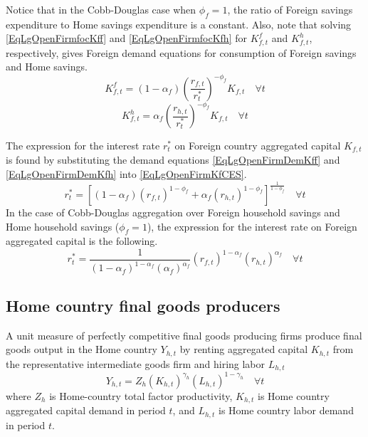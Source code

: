 \documentclass[letterpaper,12pt]{article}
\theoremstyle{definition}
\begin{document}
    Notice that in the Cobb-Douglas case when $\phi_f=1$, the ratio of Foreign savings expenditure to Home savings expenditure is a constant. Also, note that solving \eqref{EqLgOpenFirmfocKff} and \eqref{EqLgOpenFirmfocKfh} for $K^f_{f,t}$ and $K^h_{f,t}$, respectively, gives Foreign demand equations for consumption of Foreign savings and Home savings.
    \begin{equation}\label{EqLgOpenFirmDemKff}
      K^f_{f,t} = (1-\alpha_f)\left(\frac{r_{f,t}}{r^*_t}\right)^{-\phi_f}K_{f,t} \quad\forall t
    \end{equation}
    \begin{equation}\label{EqLgOpenFirmDemKfh}
      K^h_{f,t} = \alpha_f \left(\frac{r_{h,t}}{r^*_t}\right)^{-\phi_f}K_{f,t} \quad\forall t
    \end{equation}

    The expression for the interest rate $r^*_t$ on Foreign country aggregated capital $K_{f,t}$ is found by substituting the demand equations \eqref{EqLgOpenFirmDemKff} and \eqref{EqLgOpenFirmDemKfh} into \eqref{EqLgOpenFirmKfCES}.
    \begin{equation}\label{EqLgOpenFirmAggR_f}
      r^*_t = \left[(1-\alpha_f)\left(r_{f,t}\right)^{1-\phi_f} + \alpha_f \left(r_{h,t}\right)^{1-\phi_f}\right]^{\frac{1}{1-\phi_f}} \quad\forall t
    \end{equation}
    In the case of Cobb-Douglas aggregation over Foreign household savings and Home household savings ($\phi_f=1$), the expression for the interest rate on Foreign aggregated capital is the following.
    \begin{equation}\label{EqLgOpenFirmAggR_f_Cobb}
      r^*_t = \frac{1}{(1-\alpha_f)^{1-\alpha_f}(\alpha_f)^{\alpha_f}} \left(r_{f,t}\right)^{1-\alpha_f}\left(r_{h,t}\right)^{\alpha_f} \quad\forall t
    \end{equation}


  \subsection{Home country final goods producers}\label{SecLgOpenFirmFinal_H}

    A unit measure of perfectly competitive final goods producing firms produce final goods output in the Home country $Y_{h,t}$ by renting aggregated capital $K_{h,t}$ from the representative intermediate goods firm and hiring labor $L_{h,t}$
    \begin{equation}\label{EqLgOpenProdFunc_H}
      Y_{h,t} = Z_h \left(K_{h,t}\right)^{\gamma_h}\left(L_{h,t}\right)^{1-\gamma_h} \quad\forall t
    \end{equation}
    where $Z_h$ is Home-country total factor productivity, $K_{h,t}$ is Home country aggregated capital demand in period $t$, and $L_{h,t}$ is Home country labor demand in period $t$.
\end{document}
